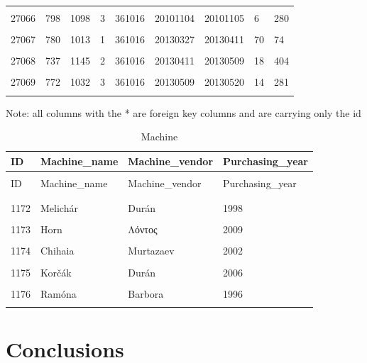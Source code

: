 \documentclass[letterpaper,12pt]{article}
\begin{document}
\begin{longtable}{p{1cm}p{1.5cm}p{1.5cm}p{1cm}p{1.5cm}p{1.8cm}p{1.6cm}p{1.3cm}p{2.2cm}}
        \hline \\
        27066 & 798 & 1098 & 3 & \color{red} 361016 & 20101104 & 20101105 & 6 & 280 \\
        \hline \\
        27067 & 780 & 1013 & 1 & \color{red} 361016 & 20130327 & 20130411 & 70 & 74 \\
        \hline \\
        27068 & 737 & 1145 & 2 & \color{red} 361016 & 20130411 & 20130509 & 18 & 404 \\
        \hline \\
        27069 & 772 & 1032 & 3 & \color{red} 361016 & 20130509 & 20130520 & 14 & 281 \\
        \hline \\
\end{longtable} 

Note: all columns with the * are foreign key columns and are carrying only the id

\begin{longtable}{p{1cm}p{3cm}p{3.2cm}p{3.1cm}}
        \caption{Machine} \\
        ID & Machine\_name & Machine\_vendor & Purchasing\_year \\
        \endfirsthead \\
        ID & Machine\_name & Machine\_vendor & Purchasing\_year \\
        \endhead \\
        \hline \\
        1172 & Melichár & Durán & 1998 \\
        \hline \\
        1173 & Horn & Λόντος & 2009 \\
        \hline \\
        1174 & Chihaia & Murtazaev & 2002 \\
        \hline \\
        1175 & Korčák & Durán & 2006 \\
        \hline \\
        \color{red} 1176 & \color{red} Ramóna & Barbora & 1996 \\
        \hline \\
\end{longtable} 

\section{Conclusions}


{}

\end{document}
